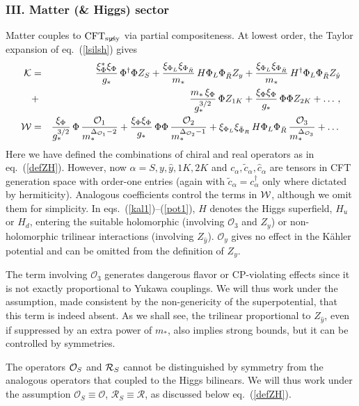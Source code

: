\documentclass[a4paper,12pt]{article}
\newcommand{\bea}{\begin{eqnarray}}
\newcommand{\eea}{\end{eqnarray}}
\def\eq#1{eq.~(\ref{#1})}
\def\eq#1{eq.~(\ref{#1})}
\def\O{\mathcal{O}}
\def\R{\mathcal{R}}
\def\mst{m_*}
\def\CFTs{{\rm CFT}_ {{\rm susy}\! \! \! \! \! \! \! \!\diagup \,\,\,}}
\begin{document}
\subsubsection*{III. Matter (\& Higgs) sector}
\unboldmath
Matter couples to $\CFTs$ via partial compositeness. At lowest order, the Taylor expansion of  \eq{lsilsh} 
gives
\bea
{\cal K} &=&\frac{ \xi_\Phi^* \xi_\Phi}{g_*} \, \Phi^\dagger \Phi Z_S + \frac{\xi_{\Phi_L} \xi_{\Phi_{\bar R}}}{\mst} \, H \Phi_L \Phi_{\bar R}  Z_{y}+
\frac{\xi_{\Phi_L} \xi_{\Phi_{\bar R}}}{\mst} \, H^\dagger \Phi_L \Phi_{\bar R}  Z_{\hat{y}}
\label{kal1}\\ &+&
\frac{\mst\, \xi_\Phi}{g_*^{3/2}} \, \Phi Z_{1K} + \frac{\xi_\Phi \xi_\Phi}{g_*} \, \Phi \Phi Z_{2K} + \dots   \, ,
\nonumber \\
{\cal W} &=& \frac{\xi_\Phi}{g_*^{3/2}} \, \Phi \, \frac{\O_1}{ \mst^{\Delta_{\O_1}-2}}+  \frac{\xi_\Phi \xi_\Phi}{g_*} \, \Phi \Phi \, \frac{\O_2}{\mst^{\Delta_{\O_2}-1}}
+   \xi_{\Phi_L} \xi_{{\bar \Phi}_R} \, H \Phi_L \Phi_{\bar R}  \, \frac{\O_{3}}{\mst^{\Delta_{\O_3}}}+\dots\, 
\label{pot1}
\eea
Here we have defined the combinations of chiral and real operators as in \eq{defZH}.
However, now $\alpha=S,y, {\hat y}, 1K,2K$ and $c_\alpha, \tilde c_\alpha, \hat c_\alpha$  are tensors in CFT generation space with order-one entries   (again with 
$\tilde c_\alpha= c_\alpha^\dagger$ only where dictated by hermiticity). Analogous coefficients control the terms in ${\cal W}$, although we omit them for simplicity.
In eqs.~(\ref{kal1})--(\ref{pot1}), $H$ denotes the Higgs superfield,  $H_u$ or $H_d$, entering the suitable holomorphic  (involving ${\O_3}$ and $Z_y$) or non-holomorphic trilinear interactions (involving $Z_{\hat{y}}$). $\O_y$ gives no effect in the K\"ahler potential and can be omitted from the definition of $Z_y$. 

The  term involving  ${\O_3}$ generates dangerous flavor or CP-violating effects since it is not exactly proportional to Yukawa couplings. We will thus work under the assumption, made consistent by the non-genericity of the superpotential, that this term is indeed absent.  As we shall see, the trilinear proportional to $Z_{\hat y}$, even if 
suppressed by an extra power of $\mst$, also implies strong bounds, but it can be controlled by symmetries.

The operators ${\cal O}_S$ and ${\cal R}_S$ cannot be distinguished by symmetry from the analogous operators 
that coupled to the Higgs bilinears. We will thus work under the assumption $\O_S\equiv  \O$, $\R_S\equiv  \R$, as discussed below \eq{defZH}.
\end{document}

